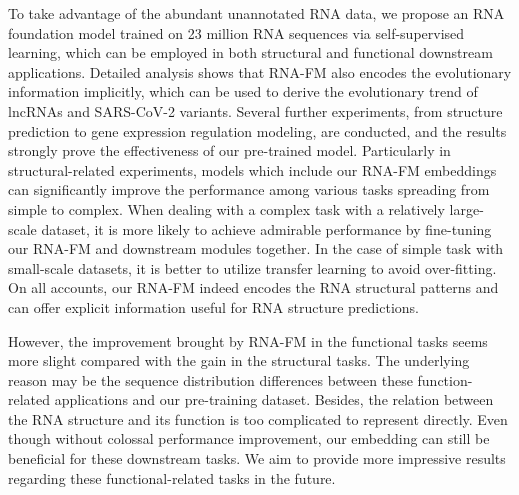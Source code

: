 To take advantage of the abundant unannotated RNA data, we propose an RNA foundation model trained on 23 million RNA sequences via self-supervised learning, which can be employed in both structural and functional downstream applications. Detailed analysis shows that RNA-FM also encodes the evolutionary information implicitly, which can be used to derive the evolutionary trend of lncRNAs and SARS-CoV-2 variants. Several further experiments, from structure prediction to gene expression regulation modeling, are conducted, and the results strongly prove the effectiveness of our pre-trained model. Particularly in structural-related experiments, models which include our RNA-FM embeddings can significantly improve the performance among various tasks spreading from simple to complex. When dealing with a complex task with a relatively large-scale dataset, it is more likely to achieve admirable performance by fine-tuning our RNA-FM and downstream modules together. In the case of simple task with small-scale datasets, it is better to utilize transfer learning to avoid over-fitting. On all accounts, our RNA-FM indeed encodes the RNA structural patterns and can offer explicit information useful for RNA structure predictions.

However, the improvement brought by RNA-FM in the functional tasks seems more slight compared with the gain in the structural tasks. The underlying reason may be the sequence distribution differences between these function-related applications and our pre-training dataset. Besides, the relation between the RNA structure and its function is too complicated to represent directly. Even though without colossal performance improvement, our embedding can still be beneficial for these downstream tasks. We aim to provide more impressive results regarding these functional-related tasks in the future. %


